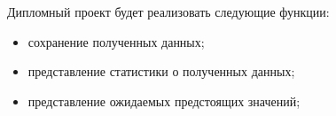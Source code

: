 Дипломный проект будет реализовать следующие функции:
\begin{itemize}
    \item сохранение полученных данных;
    \item представление статистики о полученных данных;
    \item представление ожидаемых предстоящих значений;
\end{itemize}








